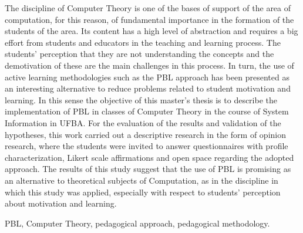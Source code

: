 \abstract
The discipline of Computer Theory is one of the bases of support
of the area of computation, for this reason, of fundamental
importance in the formation of the students of the area.
Its content has a high level of abstraction and requires a
big effort from students and educators in the teaching and
learning process.
The students' perception that they are not understanding the
concepts and the demotivation of these are the main challenges
in this process.
In turn, the use of active learning methodologies such as
the \ac{PBL} approach has been presented as an interesting
alternative to reduce problems related to student motivation
and learning.
In this sense the objective of this master's thesis is
to describe the implementation of \ac{PBL} in classes
of Computer Theory in the course of System
Information in \ac{UFBA}.
For the evaluation of the results and validation
of the hypotheses, this work carried out a descriptive
research in the form of opinion research, where the
students were invited to answer questionnaires with
profile characterization, Likert scale affirmations
and open space regarding the adopted approach.
The results of this study suggest that the use
of \ac{PBL} is promising as an alternative to theoretical
subjects of Computation, as in the discipline in which this
study was applied, especially with respect to
students' perception about motivation and learning.
\begin{keywords}
\ac{PBL}, Computer Theory, pedagogical approach,
pedagogical methodology.
\end{keywords}
